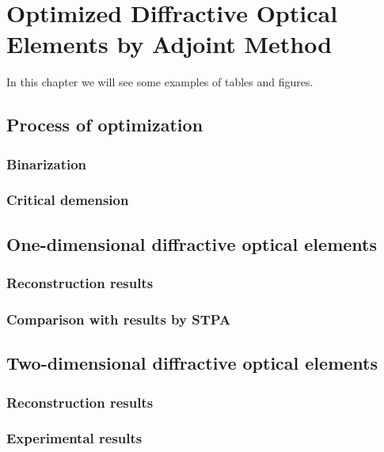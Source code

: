 \cleardoublepage
\chapter{Optimized Diffractive Optical Elements by Adjoint Method}
In this chapter we will see some examples of tables and figures.
\section{Process of optimization}
\subsection{Binarization}
\subsection{Critical demension}
\section{One-dimensional diffractive optical elements}
\subsection{Reconstruction results}
\subsection{Comparison with results by STPA}
\section{Two-dimensional diffractive optical elements}
\subsection{Reconstruction results}
\subsection{Experimental results}
\lipsum[3]
